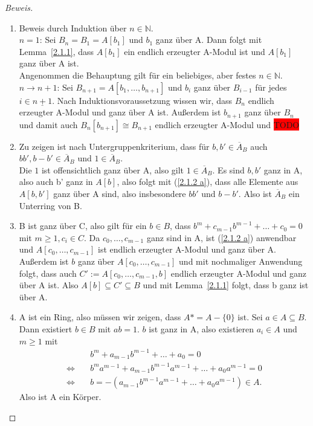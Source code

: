 \documentclass{article}
\begin{document}
	\begin{proof}[Beweis]
	\begin{enumerate}
	\item Beweis durch Induktion über \(n \in \mathbb{N}\).\\
	\(n = 1\): Sei \(B_n = B_1 = A[b_1]\) und \(b_1\) ganz über A. Dann folgt
	mit Lemma~\ref{2.1.1}, dass \(A[b_1]\) ein endlich erzeugter A-Modul ist
	und \(A[b_1]\) ganz über A ist. \\
	Angenommen die Behauptung gilt für ein beliebiges, aber festes \(n \in
	\mathbb{N}\). \\
	\(n \rightarrow n+1\): Sei \(B_{n+1} = A[b_1,\ldots,b_{n+1}]\) und \(b_i\) 
	ganz über \(B_{i-1}\) für jedes \(i \in \underline{n+1}\). Nach
	Induktionsvoraussetzung wissen wir, dass \(B_n\) endlich erzeugter A-Modul
	und ganz über A ist. Außerdem ist \(b_{n+1}\) ganz über \(B_n\) und damit
	auch \(B_n[b_{n+1}] \cong B_{n+1}\) endlich erzeugter A-Modul und \colorbox{red}{TODO}
	\item Zu zeigen ist nach Untergruppenkriterium, dass für \(b, b' \in 
	\overline{A}_B\) auch \(bb', b-b' \in \overline{A}_B\) und \(1 \in
	\overline{A}_B\). \\
	Die \(1\) ist offensichtlich ganz über A, also gilt \(1 \in \overline{A}_B\).
	Es sind \(b, b'\) ganz in A, also auch b' ganz in \(A[b]\), also folgt mit
	(\ref{2.1.2 a}), dass alle Elemente aus \(A[b,b']\) ganz über A sind, also
	insbesondere \(bb'\) und \(b-b'\). Also ist \(\overline{A}_B\) ein Unterring
	von B.
	\item B ist ganz über C, also gilt für ein \(b \in B\), dass
	\(b^m + c_{m-1}b^{m-1} + \ldots + c_0 = 0\) mit \(m \geq 1, c_i \in C\).
	Da \(c_0, \ldots, c_{m-1}\) ganz sind in A, ist (\ref{2.1.2 a}) anwendbar
	und \(A[c_0, \ldots, c_{m-1}]\) ist endlich erzeugter A-Modul und ganz über A.
	Außerdem ist \(b\) ganz über \(A[c_0, \ldots, c_{m-1}]\) und mit nochmaliger
	Anwendung folgt, dass auch \(C':=A[c_0, \ldots, c_{m-1}, b]\) endlich erzeugter
	A-Modul und ganz über A ist. Also \(A[b] \subseteq C' \subseteq B\) und
	mit Lemma~\ref{2.1.1} folgt, dass b ganz ist über A.
	\item A ist ein Ring, also müssen wir zeigen, dass \(A* = A-\{0\}\) ist.
	Sei \(a \in A \subseteq B\). Dann existiert \(b \in B\) mit \(ab = 1\).
	\(b\) ist ganz in A, also existieren \(a_i \in A\) und \(m \geq 1\) mit
	\begin{align*} &b^m + a_{m-1}b^{m-1} + \ldots + a_0 = 0 \\
	\Leftrightarrow\quad &b^ma^{m-1} + a_{m-1}b^{m-1}a^{m-1} + \ldots + a_0a^{m-1} = 0 \\
	\Leftrightarrow\quad &b = -(a_{m-1}b^{m-1}a^{m-1} + \ldots + a_0a^{m-1}) \in A.
	\end{align*}
	Also ist A ein Körper.
	\end{enumerate}
	\end{proof}
\end{document}
